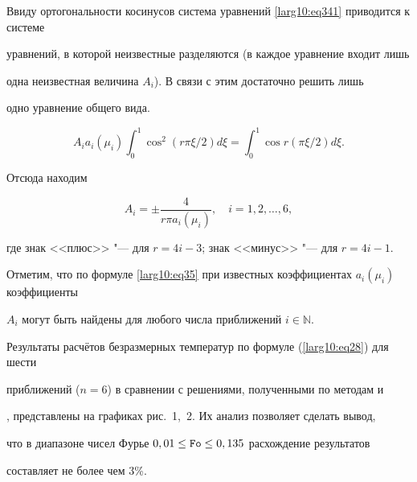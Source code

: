 %







Ввиду ортогональности косинусов система уравнений \eqref{larg10:eq341} приводится к системе

уравнений, в которой неизвестные разделяются (в каждое уравнение входит лишь

одна неизвестная величина $A_i$). В связи с этим достаточно решить лишь

одно уравнение общего вида.

\[

A_i a_i (\mu_i) \int _0^1 \cos^2 (r {\pi} \xi/2) d\xi = \int _0^1 \cos r ({\pi}\xi/2) d\xi.

\]

Отсюда находим

\begin{equation}

\label{larg10:eq35}

A_i = \pm \frac{4}{r \pi a_i (\mu_i)}, \quad i=1, 2, \dots, 6,

\end{equation}

где знак <<плюс>> "--- для $r=4i-3$; знак <<минус>> "--- для $r=4i-1$.



Отметим, что по формуле \eqref{larg10:eq35} при известных коэффициентах $a_i (\mu_i)$ коэффициенты

$A_i$ могут быть найдены для любого числа приближений $i \in \mathbb N$.



Результаты расчётов безразмерных температур по формуле (\ref{larg10:eq28}) для шести

приближений ($n=6$) в сравнении с решениями, полученными по методам \cite{larg10:3} и

\cite{larg10:4}, представлены на графиках рис.~1,~2. Их анализ позволяет сделать вывод,

что в диапазоне чисел Фурье $0,01 \le {\tt Fo} \le 0,135$ расхождение результатов

составляет не более чем 3{\%}.






